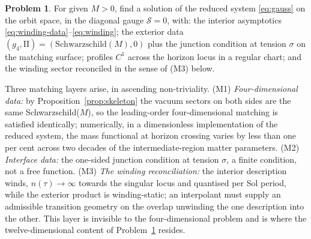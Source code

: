 \documentclass[11pt]{article}
\numberwithin{equation}{section}
\theoremstyle{plain}
\theoremstyle{definition}
\newtheorem{problem}[theorem]{Problem}
\theoremstyle{remark}
\newcommand{\II}{\mathrm{II}}
\begin{document}
\begin{problem}\label{prob:twopoint}
For given $M > 0$, find a solution of the reduced system
\eqref{eq:gauss} on the orbit space, in the diagonal gauge
$\mathcal{S} = 0$, with: the interior asymptotics
\eqref{eq:winding-data}--\eqref{eq:winding}; the exterior data
$(g_{4}, \II) = (\mathrm{Schwarzschild}(M), 0)$ plus the junction
condition at tension $\sigma$ on the matching surface; profiles $C^{1}$
across the horizon locus in a regular chart; and the winding sector
reconciled in the sense of (M3) below.
\end{problem}

Three matching layers arise, in ascending non-triviality. (M1)
\emph{Four-dimensional data:} by Proposition~\ref{prop:skeleton} the
vacuum sectors on both sides are the same Schwarzschild($M$), so the
leading-order four-dimensional matching is satisfied identically;
numerically, in a dimensionless implementation of the reduced system,
the mass functional at horizon crossing varies by less than one per
cent across two decades of the intermediate-region matter parameters.
(M2) \emph{Interface data:} the one-sided junction condition at
tension $\sigma$, a finite condition, not a free function. (M3)
\emph{The winding reconciliation:} the interior description winds,
$n(\tau) \to \infty$ towards the singular locus and quantised per Sol
period, while the exterior product is winding-static; an interpolant
must supply an admissible transition geometry on the overlap unwinding
the one description into the other. This layer is invisible to the
four-dimensional problem and is where the twelve-dimensional content
of Problem~\ref{prob:twopoint} resides.
\end{document}
